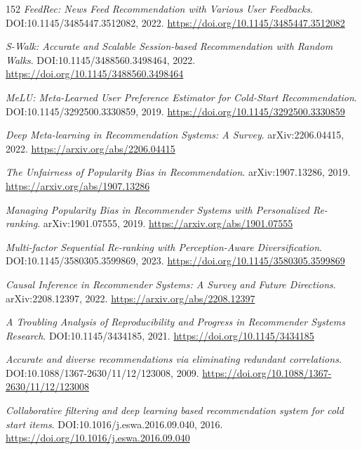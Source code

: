 \documentclass[11pt,a4paper]{article}
\begin{document}
\begin{thebibliography}{152}
\newblock \emph{FeedRec: News Feed Recommendation with Various User Feedbacks}.
\newblock DOI:10.1145/3485447.3512082, 2022.
\newblock \url{https://doi.org/10.1145/3485447.3512082}

\newblock \emph{S-Walk: Accurate and Scalable Session-based Recommendation with Random Walks}.
\newblock DOI:10.1145/3488560.3498464, 2022.
\newblock \url{https://doi.org/10.1145/3488560.3498464}

\newblock \emph{MeLU: Meta-Learned User Preference Estimator for Cold-Start Recommendation}.
\newblock DOI:10.1145/3292500.3330859, 2019.
\newblock \url{https://doi.org/10.1145/3292500.3330859}

\newblock \emph{Deep Meta-learning in Recommendation Systems: A Survey}.
\newblock arXiv:2206.04415, 2022.
\newblock \url{https://arxiv.org/abs/2206.04415}

\newblock \emph{The Unfairness of Popularity Bias in Recommendation}.
\newblock arXiv:1907.13286, 2019.
\newblock \url{https://arxiv.org/abs/1907.13286}

\newblock \emph{Managing Popularity Bias in Recommender Systems with Personalized Re-ranking}.
\newblock arXiv:1901.07555, 2019.
\newblock \url{https://arxiv.org/abs/1901.07555}

\newblock \emph{Multi-factor Sequential Re-ranking with Perception-Aware Diversification}.
\newblock DOI:10.1145/3580305.3599869, 2023.
\newblock \url{https://doi.org/10.1145/3580305.3599869}

\newblock \emph{Causal Inference in Recommender Systems: A Survey and Future Directions}.
\newblock arXiv:2208.12397, 2022.
\newblock \url{https://arxiv.org/abs/2208.12397}

\newblock \emph{A Troubling Analysis of Reproducibility and Progress in Recommender Systems Research}.
\newblock DOI:10.1145/3434185, 2021.
\newblock \url{https://doi.org/10.1145/3434185}

\newblock \emph{Accurate and diverse recommendations via eliminating redundant correlations}.
\newblock DOI:10.1088/1367-2630/11/12/123008, 2009.
\newblock \url{https://doi.org/10.1088/1367-2630/11/12/123008}

\newblock \emph{Collaborative filtering and deep learning based recommendation system for cold start items}.
\newblock DOI:10.1016/j.eswa.2016.09.040, 2016.
\newblock \url{https://doi.org/10.1016/j.eswa.2016.09.040}


\end{thebibliography}
\end{document}
